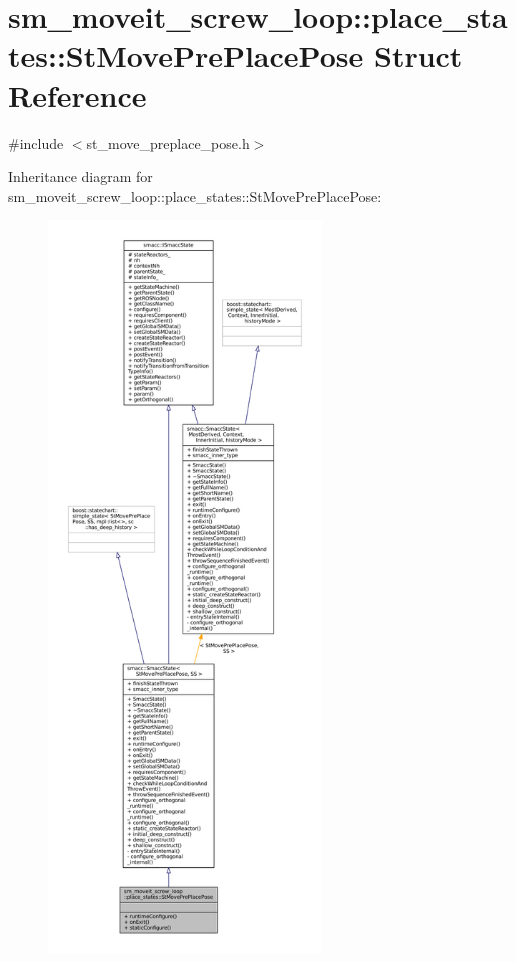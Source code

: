 \hypertarget{structsm__moveit__screw__loop_1_1place__states_1_1StMovePrePlacePose}{}\section{sm\+\_\+moveit\+\_\+screw\+\_\+loop\+:\+:place\+\_\+states\+:\+:St\+Move\+Pre\+Place\+Pose Struct Reference}
\label{structsm__moveit__screw__loop_1_1place__states_1_1StMovePrePlacePose}


{\ttfamily \#include $<$st\+\_\+move\+\_\+preplace\+\_\+pose.\+h$>$}



Inheritance diagram for sm\+\_\+moveit\+\_\+screw\+\_\+loop\+:\+:place\+\_\+states\+:\+:St\+Move\+Pre\+Place\+Pose\+:
\nopagebreak
\begin{figure}[H]
\begin{center}
\leavevmode
\includegraphics[height=550pt]{structsm__moveit__screw__loop_1_1place__states_1_1StMovePrePlacePose__inherit__graph}
\end{center}
\end{figure}


